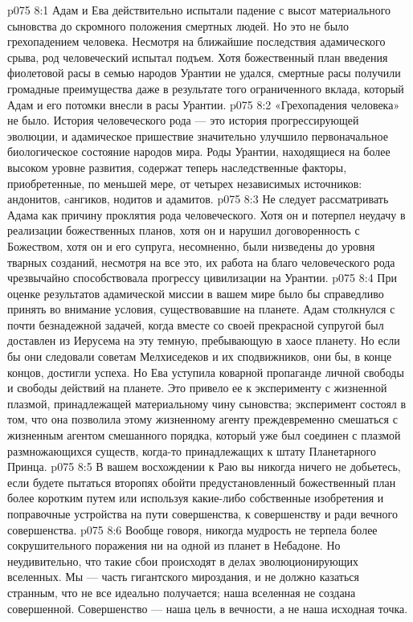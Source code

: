 \vs p075 8:1 Адам и Ева действительно испытали падение с высот материального сыновства до скромного положения смертных людей. Но это не было грехопадением человека. Несмотря на ближайшие последствия адамического срыва, род человеческий испытал подъем. Хотя божественный план введения фиолетовой расы в семью народов Урантии не удался, смертные расы получили громадные преимущества даже в результате того ограниченного вклада, который Адам и его потомки внесли в расы Урантии.
\vs p075 8:2 «Грехопадения человека» не было. История человеческого рода --- это история прогрессирующей эволюции, и адамическое пришествие значительно улучшило первоначальное биологическое состояние народов мира. Роды Урантии, находящиеся на более высоком уровне развития, содержат теперь наследственные факторы, приобретенные, по меньшей мере, от четырех независимых источников: андонитов, cангиков, нодитов и адамитов.
\vs p075 8:3 Не следует рассматривать Адама как причину проклятия рода человеческого. Хотя он и потерпел неудачу в реализации божественных планов, хотя он и нарушил договоренность с Божеством, хотя он и его супруга, несомненно, были низведены до уровня тварных созданий, несмотря на все это, их работа на благо человеческого рода чрезвычайно способствовала прогрессу цивилизации на Урантии.
\vs p075 8:4 \pc При оценке результатов адамической миссии в вашем мире было бы справедливо принять во внимание условия, существовавшие на планете. Адам столкнулся с почти безнадежной задачей, когда вместе со своей прекрасной супругой был доставлен из Иерусема на эту темную, пребывающую в хаосе планету. Но если бы они следовали советам Мелхиседеков и их сподвижников,  они бы, в конце концов, достигли успеха. Но Ева уступила коварной пропаганде личной свободы и свободы действий на планете. Это привело ее к эксперименту с жизненной плазмой, принадлежащей материальному чину сыновства; эксперимент состоял в том, что она позволила этому жизненному агенту преждевременно смешаться с жизненным агентом смешанного порядка, который уже был соединен с плазмой размножающихся существ, когда\hyp{}то принадлежащих к штату Планетарного Принца.
\vs p075 8:5 В вашем восхождении к Раю вы никогда ничего не добьетесь, если будете пытаться второпях обойти предустановленный божественный план более коротким путем или используя какие\hyp{}либо собственные изобретения и поправочные устройства на пути совершенства, к совершенству и ради вечного совершенства.
\vs p075 8:6 \pc Вообще говоря, никогда мудрость не терпела более сокрушительного поражения ни на одной из планет в Небадоне. Но неудивительно, что такие сбои происходят в делах эволюционирующих вселенных. Мы --- часть гигантского мироздания, и не должно казаться странным, что не все идеально получается; наша вселенная не создана совершенной. Совершенство --- наша цель в вечности, а не наша исходная точка.
